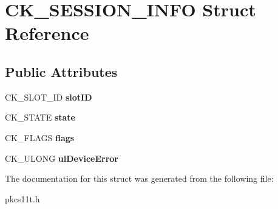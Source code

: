 \hypertarget{struct_c_k___s_e_s_s_i_o_n___i_n_f_o}{}\section{C\+K\+\_\+\+S\+E\+S\+S\+I\+O\+N\+\_\+\+I\+N\+FO Struct Reference}
\label{struct_c_k___s_e_s_s_i_o_n___i_n_f_o}
\subsection*{Public Attributes}
\begin{DoxyCompactItemize}
\item 
\mbox{\label{struct_c_k___s_e_s_s_i_o_n___i_n_f_o_a7d23320809045e8e249f7eaee3be95dc}} 
C\+K\+\_\+\+S\+L\+O\+T\+\_\+\+ID {\bfseries slot\+ID}
\item 
\mbox{\label{struct_c_k___s_e_s_s_i_o_n___i_n_f_o_af81b1726577cff3cb2ea3300d788e9f4}} 
C\+K\+\_\+\+S\+T\+A\+TE {\bfseries state}
\item 
\mbox{\label{struct_c_k___s_e_s_s_i_o_n___i_n_f_o_a58c14db50c63ab280fa00711755b10d9}} 
C\+K\+\_\+\+F\+L\+A\+GS {\bfseries flags}
\item 
\mbox{\label{struct_c_k___s_e_s_s_i_o_n___i_n_f_o_aced90615c518173a0e3fffc37c5e119f}} 
C\+K\+\_\+\+U\+L\+O\+NG {\bfseries ul\+Device\+Error}
\end{DoxyCompactItemize}


The documentation for this struct was generated from the following file\+:\begin{DoxyCompactItemize}
\item 
pkcs11t.\+h\end{DoxyCompactItemize}
